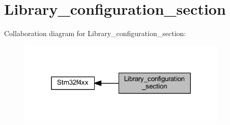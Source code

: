 \hypertarget{group___library__configuration__section}{}\section{Library\+\_\+configuration\+\_\+section}
\label{group___library__configuration__section}
Collaboration diagram for Library\+\_\+configuration\+\_\+section\+:\nopagebreak
\begin{figure}[H]
\begin{center}
\leavevmode
\includegraphics[width=285pt]{group___library__configuration__section}
\end{center}
\end{figure}
